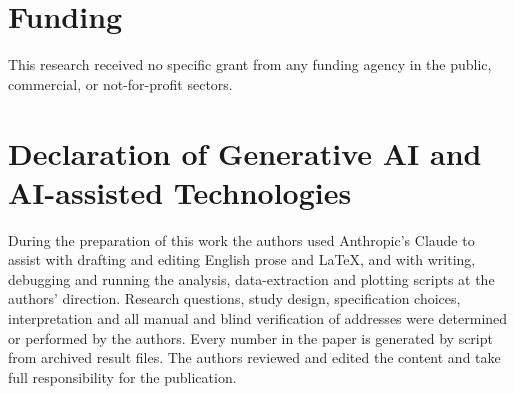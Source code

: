 \section*{Funding}
This research received no specific grant from any funding agency in the
public, commercial, or not-for-profit sectors.

\section*{Declaration of Generative AI and AI-assisted Technologies}
During the preparation of this work the authors used Anthropic's Claude to
assist with drafting and editing English prose and LaTeX, and with writing,
debugging and running the analysis, data-extraction and plotting scripts at
the authors' direction. Research questions, study design, specification
choices, interpretation and all manual and blind verification of addresses
were determined or performed by the authors. Every number in the paper is
generated by script from archived result files. The authors reviewed and
edited the content and take full responsibility for the publication.
